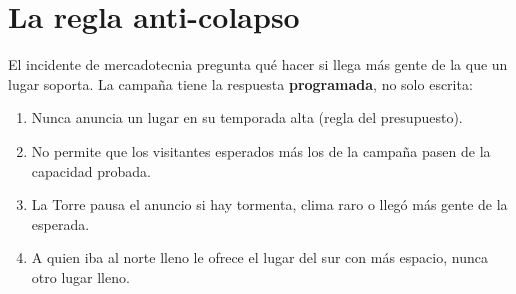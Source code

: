 \section{La regla anti-colapso}
El incidente de mercadotecnia pregunta qué hacer si llega más gente de la que un lugar soporta. La campaña tiene la
respuesta \textbf{programada}, no solo escrita:
\begin{enumerate}
\item Nunca anuncia un lugar en su temporada alta (regla del presupuesto).
\item No permite que los visitantes esperados más los de la campaña pasen de la capacidad probada.
\item La Torre pausa el anuncio si hay tormenta, clima raro o llegó más gente de la esperada.
\item A quien iba al norte lleno le ofrece el lugar del sur con más espacio, nunca otro lugar lleno.
\end{enumerate}
